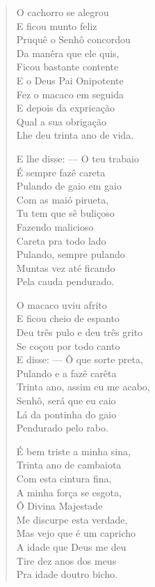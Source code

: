 \begin{verse}
O cachorro se alegrou\\
E ficou munto feliz\\
Pruquê o Senhô concordou\\
Da manêra que ele quis,\\
Ficou bastante contente\\
E o Deus Pai Onipotente\\
Fez o macaco em seguida\\
E depois da expricação\\
Qual a sua obrigação\\
Lhe deu trinta ano de vida.

E lhe disse: --- O teu trabaio\\
É sempre fazê careta\\
Pulando de gaio em gaio\\
Com as maió pirueta,\\
Tu tem que sê buliçoso\\
Fazendo malicioso\\
Careta pra todo lado\\
Pulando, sempre pulando\\
Muntas vez até ficando\\
Pela cauda pendurado.

O macaco uviu afrito\\
E ficou cheio de espanto\\
Deu três pulo e deu três grito\\
Se coçou por todo canto\\
E disse: --- Ô que sorte preta,\\
Pulando e a fazê carêta\\
Trinta ano, assim eu me acabo,\\
Senhô, será que eu caio\\
Lá da pontinha do gaio\\
Pendurado pelo rabo.

É bem triste a minha sina,\\
Trinta ano de cambaiota\\
Com esta cintura fina,\\
A minha força se esgota,\\
Ô Divina Majestade\\
Me discurpe esta verdade,\\
Mas vejo que é um capricho\\
A idade que Deus me deu\\
Tire dez anos dos meus\\
Pra idade doutro bicho.


\end{verse}
